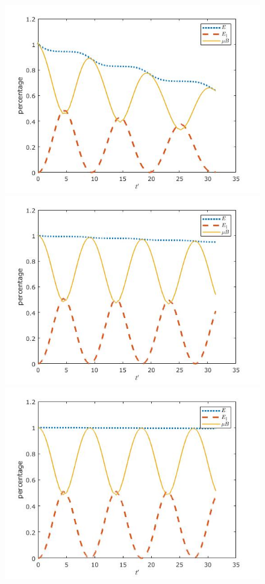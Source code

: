 \documentclass{article}
\begin{document}
\begin{enumerate}
\begin{enumerate}
\begin{figure}[h]
\centering
\vbox{
\includegraphics[scale=0.29]{problem4a/energy_5000.jpg}
\includegraphics[scale=0.29]{problem4a/energy_10000.jpg}
}
\vbox{
\includegraphics[scale=0.29]{problem4a/energy_20000.jpg}
}
\end{figure}
\end{enumerate}
\end{enumerate}
\end{document}
